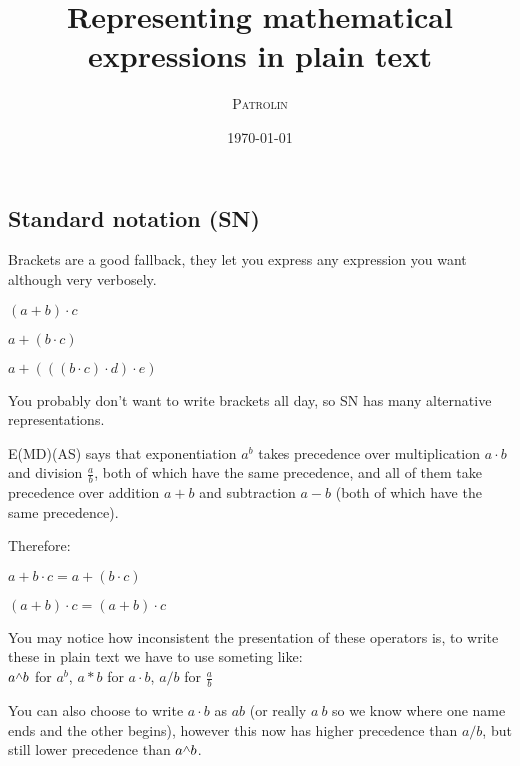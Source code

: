 \documentclass[twoside]{article}
\title{Representing mathematical expressions in plain text}
\author{\textsc{Patrolin}}
\date{\today}
\newcommand{\F}[2]{\frac{#1}{#2}} %
\newcommand{\caret}{\raisebox{0.5ex}{$\scriptstyle\wedge$}}
\begin{document}
    \maketitle
    \thispagestyle{empty}

    \begin{multicols*}{2}
        \section{Standard notation (SN)}
            Brackets are a good fallback, they let you express any expression you want although very verbosely.\vspace{1px}\\
            \centerline{$ (a + b) \cdot c $}
            \centerline{$ a + (b \cdot c) $}
            \centerline{$ a + (((b \cdot c) \cdot d) \cdot e) $}
            \par\vspace{5px}
                You probably don't want to write brackets all day,
                so SN has many alternative representations.
                \par
                E(MD)(AS) says that exponentiation $a^b$ takes precedence
                over multiplication $a\cdot{}b$ and division $\F{a}{b}$, both of which have the same precedence,
                and all of them take precedence over addition $a+b$ and subtraction $a-b$ (both of which have the same precedence).
                \par
                Therefore:\vspace{2px}\\
                \centerline{$ a + b \cdot c = a + (b \cdot c) $}
                \centerline{$ (a + b) \cdot c = (a + b) \cdot c $}\vspace{-1px}
            \par\vspace{5px}
                You may notice how inconsistent the presentation of these operators is,
                to write these in plain text we have to use someting like:\\
                $a\caret{}b$ for $a^b$, $a*b$ for $a\cdot{}b$, $a/b$ for $\F{a}{b}$
                \par
                You can also choose to write $a\cdot{}b$ as $ab$
                (or really $a\ b$ so we know where one name ends and the other begins),
                however this now has higher precedence than $a/b$, but still lower precedence than $a\caret{}b$.
            \par\vspace{5px}

\end{multicols*}
\end{document}
